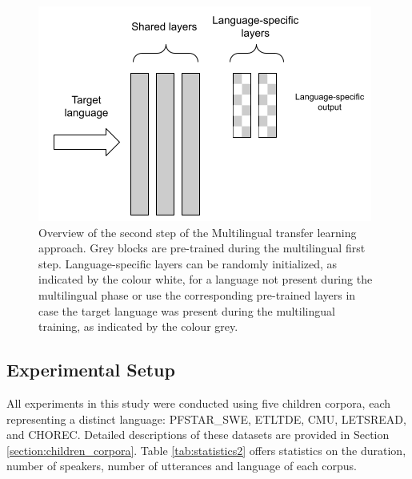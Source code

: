 
\begin{figure}[t]
\begin{center}
\includegraphics[scale=0.7]{imgs/Ours_final.png}
\caption{Overview of the second step of the Multilingual transfer learning approach. Grey blocks are pre-trained during the multilingual first step. Language-specific layers can be randomly initialized, as indicated by the colour white, for a language not present during the multilingual phase or use the corresponding pre-trained layers in case the target language was present during the multilingual training, as indicated by the colour grey.}
\label{fig:MLTL1}
\end{center}
\end{figure}


\subsection{Experimental Setup}
\label{section:corpus}
All experiments in this study were conducted using five children corpora, each representing a distinct language: PFSTAR\_SWE, ETLTDE, CMU, LETSREAD, and CHOREC. Detailed descriptions of these datasets are provided in Section \ref{section:children_corpora}. Table \ref{tab:statistics2} offers statistics on the duration, number of speakers, number of utterances and language of each corpus.

